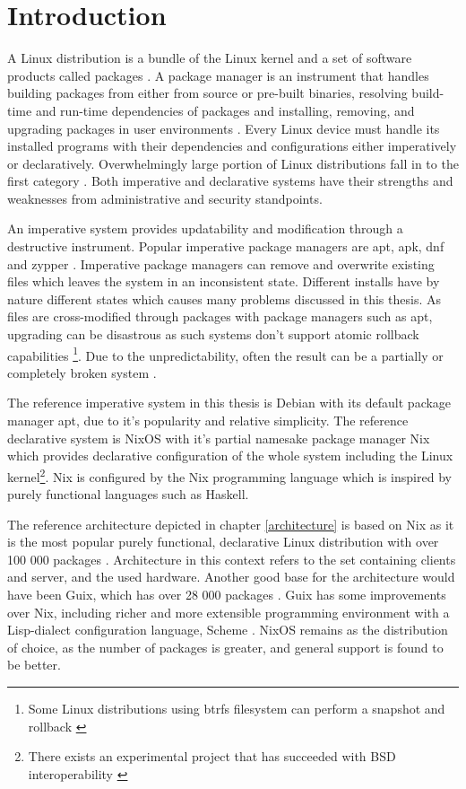 \chapter{Introduction} \label{johdanto}

A Linux distribution is a bundle of the Linux kernel and a set of
software products called packages \cite{gnuPackagesx2014}. A package
manager is an instrument that handles building packages from either
from source or pre-built binaries, resolving build-time and run-time
dependencies of packages and installing, removing, and upgrading
packages in user environments \cite{gnuPackagesx2014}. Every Linux
device must handle its installed programs with their dependencies and
configurations either imperatively or declaratively. Overwhelmingly
large portion of Linux distributions fall in to the first category
\cite{dolstra2008nixos}. Both imperative and declarative systems have
their strengths and weaknesses from administrative and security
standpoints.

An imperative system provides updatability and modification through a
destructive instrument. Popular imperative package managers are apt,
apk, dnf and zypper \cite{dolstra2008nixos}. Imperative package
managers can remove and overwrite existing files which leaves the
system in an inconsistent state. Different installs have by nature
different states which causes many problems discussed in this
thesis. As files are cross-modified through packages with package
managers such as apt, upgrading can be disastrous as such systems
don't support atomic rollback capabilities \footnote{Some Linux
distributions using btrfs filesystem can perform a snapshot and
rollback \cite{opensuseSystemRecovery}}. Due to the unpredictability,
often the result can be a partially or completely broken system
\cite{dolstra2008nixos}.

The reference imperative system in this thesis is Debian with its
default package manager apt, due to it's popularity and relative
simplicity. The reference declarative system is
NixOS with it's partial namesake package manager Nix which provides declarative
configuration of the whole system including the Linux
kernel\footnote{There exists an experimental project that has
succeeded with BSD interoperability \cite{githubGitHubNixosbsdnixbsd}}. Nix is configured by the Nix
programming language which is inspired by purely functional languages
such as Haskell. \cite{van2013reference}

The reference architecture depicted in chapter \ref{architecture} is
based on Nix as it is the most popular purely functional, declarative
Linux distribution with over 100 000 packages
\cite{nixosNixOSSearch}. Architecture in this context refers to the
set containing clients and server, and the used hardware. Another good
base for the architecture would have been Guix, which has over 28 000
packages \cite{gnuPackagesx2014}. Guix has some improvements over Nix,
including richer and more extensible programming environment with a
Lisp-dialect configuration language, Scheme
\cite{courtes2021deploiements}. NixOS remains as the distribution of
choice, as the number of packages is greater, and general support is
found to be better.


